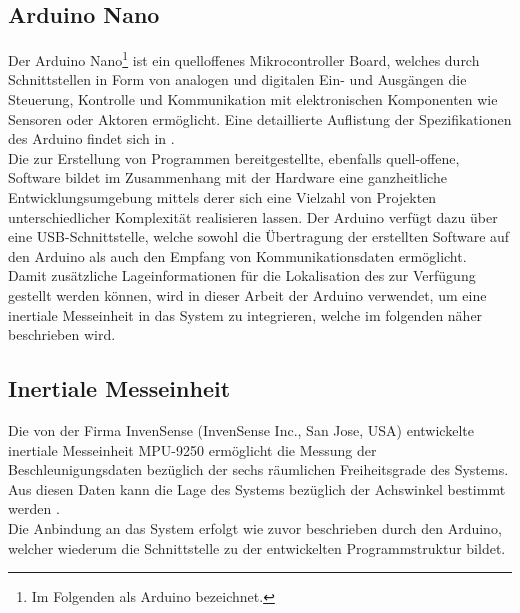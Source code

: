 \subsection{Arduino\textsuperscript{\texttrademark} Nano}
\label{chap.arduino}
Der Arduino\textsuperscript{\texttrademark} Nano\footnote{Im Folgenden als Arduino bezeichnet.} ist ein quelloffenes Mikrocontroller Board, welches durch Schnittstellen in Form von analogen und digitalen Ein- und Ausgängen die Steuerung, Kontrolle und Kommunikation mit elektronischen Komponenten wie Sensoren oder Aktoren ermöglicht. Eine detaillierte Auflistung der Spezifikationen des Arduino findet sich in .\\
Die zur Erstellung von Programmen bereitgestellte, ebenfalls quell-offene, Software bildet im Zusammenhang mit der Hardware eine ganzheitliche Entwicklungsumgebung mittels derer sich eine Vielzahl von Projekten unterschiedlicher Komplexität realisieren lassen. Der Arduino verfügt dazu über eine USB-Schnittstelle, welche sowohl die Übertragung der erstellten Software auf den Arduino als auch den Empfang von Kommunikationsdaten ermöglicht.\\
Damit zusätzliche Lageinformationen für die Lokalisation des  zur Verfügung gestellt werden können, wird in dieser Arbeit der Arduino verwendet, um eine inertiale Messeinheit in das System zu integrieren, welche im folgenden näher beschrieben wird.

\prever{
}


\subsection{Inertiale Messeinheit}
\label{chap.imu}
Die von der Firma InvenSense (InvenSense Inc., San Jose, USA) entwickelte inertiale Messeinheit MPU-9250 ermöglicht die Messung der Beschleunigungsdaten bezüglich der sechs räumlichen Freiheitsgrade des Systems. Aus diesen Daten kann die Lage des Systems bezüglich der Achswinkel bestimmt werden \cite{IMU}.\\
Die Anbindung an das System erfolgt wie zuvor beschrieben durch den Arduino, welcher wiederum die Schnittstelle zu der entwickelten Programmstruktur bildet.\\

